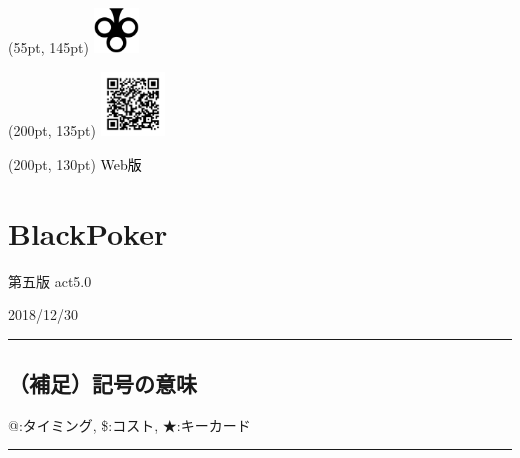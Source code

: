 \documentclass[twocolumn,a5paper,papersize,10pt]{jarticle}
\title{\empty}
\author{\empty}
\date{\empty}
\begin{document}
\begin{textblock*}{0.4\linewidth}(55pt, 145pt)
    \centering
    \includegraphics[width=1.2cm]{blackpoker_logo.pdf}
\end{textblock*}

\begin{textblock*}{0.4\linewidth}(200pt, 135pt)
    \centering
    \includegraphics[width=1.7cm,keepaspectratio]{qr_blackpoker-support_v5-pro.pdf}
\end{textblock*}
\begin{textblock*}{0.4\linewidth}(200pt, 130pt)
    \centering
    \textcolor{black}{Web版}
\end{textblock*}


\section*{\textrm{\Large BlackPoker}}
\vspace{-1zh}%
\noindent

\begin{center}
第五版 act5.0

{\scriptsize 2018/12/30}
\end{center}

\scriptsize%
\renewcommand{\labelitemi}{・}%
\hrule height 0.5mm depth 0mm width 66.5mm %
\vspace{-3zh}%
\subsection*{（補足）記号の意味}
\vspace{-1zh}%
{\small @:タイミング, 
\$:コスト, 
★:キーカード}

\vspace{1mm}%
\hrule height 0.1mm depth 0mm width 66.5mm %
\vspace{-3zh}%
\end{document}
